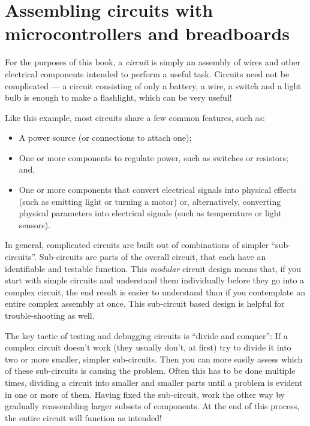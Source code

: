 \section{Assembling circuits with microcontrollers and breadboards}
For the purposes of this book, a \emph{circuit} is simply an assembly of wires and other electrical components intended to perform a useful task. 
Circuits need not be complicated --- a circuit consisting of only a battery, a wire, a switch and a light bulb is enough to make a flashlight, which can be very useful! 

Like this example, most circuits share a few common features, such as:
\begin{itemize}
	 \item A power source (or connections to attach one);
	 \item One or more components to regulate power, such as switches or resistors; and,
	 \item One or more components that convert electrical signals into physical effects (such as emitting light or turning a motor) or, alternatively, converting physical parameters into electrical signals (such as temperature or light sensors). 
\end{itemize}

In general, complicated circuits are built out of combinations of simpler ``sub-circuits''. Sub-circuits are parts of the overall circuit, that each have an identifiable and testable function. 
This \emph{modular} circuit design means that, if you start with simple circuits and understand them individually before they go into a complex circuit, the end result is easier to understand than if you contemplate an entire complex assembly at once. 
This sub-circuit based design is helpful for trouble-shooting as well.
	\begin{kaobox}[frametitle=Divide and conquer!]
		The key tactic of testing and debugging circuits is ``divide and conquer'': 
		If a complex circuit doesn't work (they usually don't, at first) try to divide it into two or more smaller, simpler sub-circuits.
		Then you can more easily assess which of these sub-circuits is causing the problem. 
		Often this has to be done multiple times, dividing a circuit into smaller and smaller parts until a problem is evident in one or more of them. 
		Having fixed the sub-circuit, work the other way by gradually reassembling larger subsets of components. 
		At the end of this process, the entire circuit will function as intended!
	\end{kaobox}

